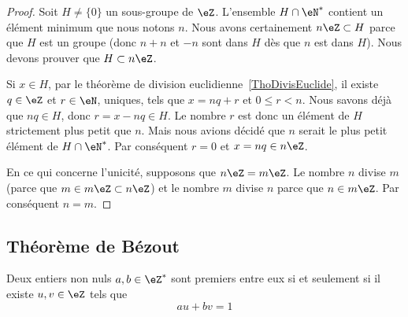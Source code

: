\begin{proof}
	Soit \( H\neq\{ 0 \}\) un sous-groupe de \( \eZ\). L'ensemble \( H\cap\eN^*\) contient un élément minimum que nous notons \( n\). Nous avons certainement \( n\eZ\subset H\) parce que \( H\) est un groupe (donc \( n+n\) et \( -n\) sont dans \( H\) dès que \( n\) est dans \( H\)). Nous devons prouver que \( H\subset n\eZ\).

	Si \( x\in H\), par le théorème de division euclidienne~\ref{ThoDivisEuclide}, il existe \( q\in\eZ\) et \( r\in\eN \), uniques, tels que \( x=nq+r\) et \(0 \leq r < n \). Nous savons déjà que \( nq\in H\), donc \( r = x - nq \in H \). Le nombre \( r\) est donc un élément de \( H\) strictement plus petit que \( n\). Mais nous avions décidé que \( n\) serait le plus petit élément de \( H\cap\eN^*\). Par conséquent \( r=0\) et \( x=nq\in n\eZ\).


	En ce qui concerne l'unicité, supposons que \( n\eZ=m\eZ\). Le nombre \( n\) divise \( m\) (parce que \( m\in m\eZ\subset n\eZ\)) et le nombre \( m\) divise \( n\) parce que \( n\in m\eZ\). Par conséquent \( n=m\).
\end{proof}



\subsection{Théorème de Bézout}

\begin{theorem} \label{ThoBuNjam}
	Deux entiers non nuls \( a,b\in\eZ^*\) sont premiers entre eux si et seulement si il existe \( u,v\in\eZ\) tels que
	\begin{equation}
		au+bv=1
	\end{equation}
\end{theorem}

